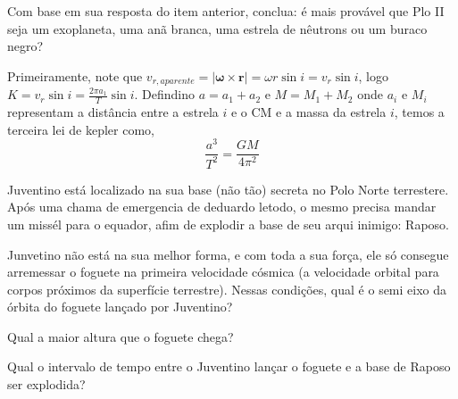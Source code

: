 \documentclass[11pt]{article}
\begin{document}
\begin{pproblem}
\begin{alternativas}
        \item Com base em sua resposta do item anterior, conclua: é mais provável que Plo II seja um exoplaneta, uma anã branca, uma estrela de nêutrons ou um buraco negro?
    \end{alternativas}
    \begin{pssolution*}{}{}
        \begin{alternativas}
            \item Primeiramente, note que \(v_{r, aparente} = |\mathbf{\omega}\times\mathbf{r}| = \omega r \sin i = v_r \sin i\), logo \(K = v_r\sin i = \frac{2\pi a_1}{T}\sin i\). Defindino \(a=a_1+a_2\) e \(M = M_1+M_2\) onde \(a_i\) e \(M_i\) representam a distância entre a estrela \(i\) e o CM e a massa da estrela \(i\), temos a terceira lei de kepler como, 
            \[\frac{a^3}{T^2} = \frac{GM}{4\pi^2}\]
        \end{alternativas}
    \end{pssolution*}
\end{pproblem}

\begin{pproblem} Juventino está localizado na sua base (não tão) secreta no Polo Norte terrestere. Após uma chama de emergencia de deduardo letodo, o mesmo precisa mandar um missél para o equador, afim de explodir a base de seu arqui inimigo: Raposo. 
    \begin{alternativas}
        \item Junvetino não está na sua melhor forma, e com toda a sua força, ele só consegue arremessar o foguete na primeira velocidade cósmica (a velocidade orbital para corpos próximos da superfície terrestre). Nessas condições, qual é o semi eixo da órbita do foguete lançado por Juventino?
        \item Qual a maior altura que o foguete chega?
        \item Qual o intervalo de tempo entre o Juventino lançar o foguete e a base de Raposo ser explodida?
    \end{alternativas}
    
\end{pproblem}
    
\end{document}
